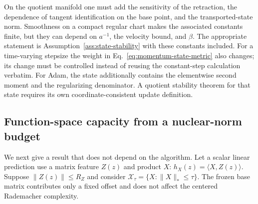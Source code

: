 On the quotient manifold one must add the sensitivity of the retraction,
the dependence of tangent identification on the base point, and the
transported-state norm. Smoothness on a compact regular chart makes the
associated constants finite, but they can depend on $a^{-1}$, the velocity
bound, and $\beta$. The appropriate statement is
Assumption~\ref{ass:state-stability} with these constants included.
For a time-varying stepsize the weight in
Eq.~\eqref{eq:momentum-state-metric} also changes; its change must be
controlled instead of reusing the constant-step calculation verbatim.
For Adam, the state additionally contains the elementwise second moment
and the regularizing denominator. A quotient stability theorem for that
state requires its own coordinate-consistent update definition.

\subsection{Function-space capacity from a nuclear-norm budget}
We next give a result that does not depend on the algorithm. Let a scalar
linear prediction use a matrix feature $Z(z)$ and product $X$:
$h_X(z)=\langle X,Z(z)\rangle$. Suppose
$\|Z(z)\|\leq R_Z$ and consider $\mathcal X_\tau=\{X:\|X\|_*\leq\tau\}$.
The frozen base matrix contributes only a fixed offset and does not affect
the centered Rademacher complexity.

